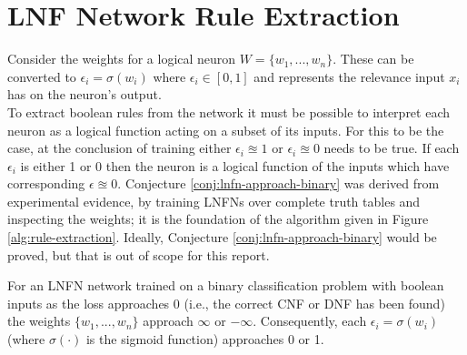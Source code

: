 \section{LNF Network Rule Extraction} \label{sec:lnfn-rule-extraction}
Consider the weights for a logical neuron $W = \{w_1, ..., w_n\}$. These can be converted to $\epsilon_i = \sigma(w_i)$ where $\epsilon_i \in [0, 1]$ and represents the relevance input $x_i$ has on the neuron's output.\\

To extract boolean rules from the network it must be possible to interpret each neuron as a logical function acting on a subset of its inputs. For this to be the case, at the conclusion of training either $\epsilon_i \approxeq 1$ or $\epsilon_i \approxeq 0$ needs to be true. If each $\epsilon_i$ is either 1 or 0 then the neuron is a logical function of the inputs which have corresponding $\epsilon \approxeq 0$. Conjecture \ref{conj:lnfn-approach-binary} was derived from experimental evidence, by training LNFNs over complete truth tables and inspecting the weights; it is the foundation of the algorithm given in Figure \ref{alg:rule-extraction}. Ideally, Conjecture \ref{conj:lnfn-approach-binary} would be proved, but that is out of scope for this report.

\begin{conjecture}
	For an LNFN network trained on a binary classification problem with boolean inputs as the loss approaches 0  (i.e., the correct CNF or DNF has been found) the weights $\{ w_1, ..., w_n \}$ approach $\infty$ or $-\infty$. Consequently, each $\epsilon_i = \sigma(w_i)$ (where $\sigma(\cdot)$ is the sigmoid function) approaches 0 or 1.
	\label{conj:lnfn-approach-binary}
\end{conjecture}

